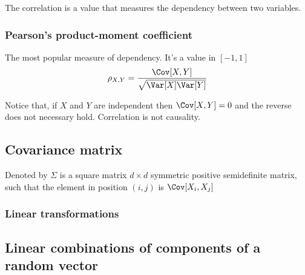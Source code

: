 The correlation is a value that measures the dependency between two variables.

\subsubsection{Pearson's product-moment coefficient} %
\label{ssub:pearson_s_product_moment_coefficient}

The most popular measure of dependency. It's a value in $[-1,1]$ 
\begin{equation*}
    \rho_{X,Y} = \dfrac{\Cov[X,Y]}{\sqrt{\Var[X]\Var[Y]}}
\end{equation*}


\begin{tcolorbox}
    Notice that, if $X$ and $Y$ are independent then $\Cov[X,Y]=0$ and the
    reverse does not necessary hold. Correlation is not causality.    
\end{tcolorbox}


\subsection{Covariance matrix} %
\label{sub:covariance_matrix}

Denoted by $\Sigma$ is a square matrix $d \times d$ symmetric positive
semidefinite matrix, such that the element in position $(i,j)$ is
$\Cov[X_i,X_j]$

\subsubsection{Linear transformations} %
\label{ssub:linear_transformations}


\subsection{Linear combinations of components of a random vector} %
\label{sub:linear_combinations_of_components_of_a_random_vector}


